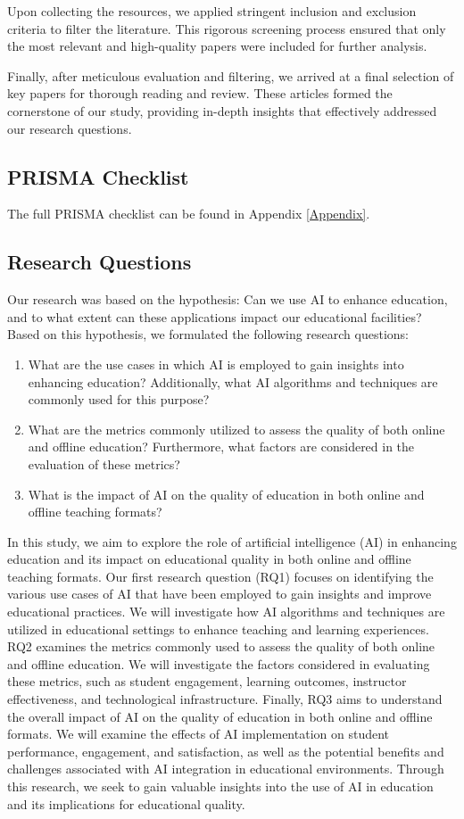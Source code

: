 \documentclass{svproc}
\begin{document}
Upon collecting the resources, we applied stringent inclusion and exclusion criteria to filter the literature. This rigorous screening process ensured that only the most relevant and high-quality papers were included for further analysis.

Finally, after meticulous evaluation and filtering, we arrived at a final selection of key papers for thorough reading and review. These articles formed the cornerstone of our study, providing in-depth insights that effectively addressed our research questions.

\subsection{PRISMA Checklist}
The full PRISMA checklist can be found in Appendix \ref{Appendix}.

\subsection{Research Questions}
Our research was based on the hypothesis: Can we use AI to enhance education, and to what extent can these applications impact our educational facilities? Based on this hypothesis, we formulated the following research questions:

\begin{enumerate}
\item[RQ1.] What are the use cases in which AI is employed to gain insights into enhancing education? Additionally, what AI algorithms and techniques are commonly used for this purpose? \label{RQ1}
\item[RQ2.] What are the metrics commonly utilized to assess the quality of both online and offline education? Furthermore, what factors are considered in the evaluation of these metrics?
\item[RQ3.] What is the impact of AI on the quality of education in both online and offline teaching formats?
\end{enumerate}


In this study, we aim to explore the role of artificial intelligence (AI) in enhancing education and its impact on educational quality in both online and offline teaching formats. Our first research question (RQ1) focuses on identifying the various use cases of AI that have been employed to gain insights and improve educational practices. We will investigate how AI algorithms and techniques are utilized in educational settings to enhance teaching and learning experiences. RQ2 examines the metrics commonly used to assess the quality of both online and offline education. We will investigate the factors considered in evaluating these metrics, such as student engagement, learning outcomes, instructor effectiveness, and technological infrastructure. Finally, RQ3 aims to understand the overall impact of AI on the quality of education in both online and offline formats. We will examine the effects of AI implementation on student performance, engagement, and satisfaction, as well as the potential benefits and challenges associated with AI integration in educational environments. Through this research, we seek to gain valuable insights into the use of AI in education and its implications for educational quality.
\end{document}
